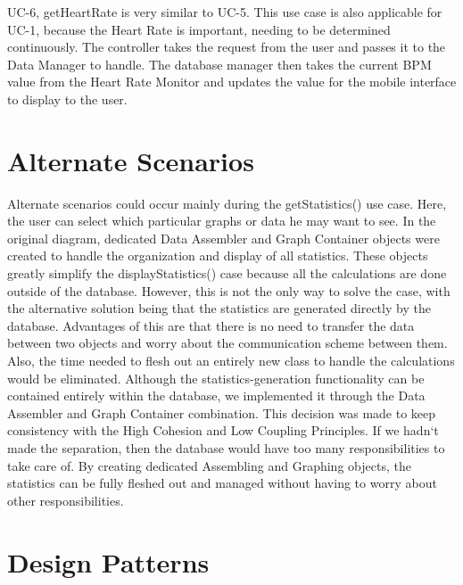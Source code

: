 \documentclass[letterpaper,english, 12pt]{scrreprt}
\begin{document}
UC-6, getHeartRate is very similar to UC-5. This use case is also applicable for UC-1, because the Heart Rate is important, needing to be determined continuously. The controller takes the request from the user and passes it to the Data Manager to handle. The database manager then takes the current BPM value from the Heart Rate Monitor and updates the value for the mobile interface to display to the user. 


\section{Alternate Scenarios}

Alternate scenarios could occur mainly during the getStatistics() use case. Here, the user can select which particular graphs or data he may want to see. In the original diagram,  dedicated Data Assembler and Graph Container objects were created to handle the organization and display of all statistics. These objects greatly simplify the displayStatistics() case because all the calculations are done outside of the database. However, this is not the only way to solve the case, with the alternative solution being that the statistics are generated directly by the database. Advantages of this are that there is no need to transfer the data between two objects and worry about the communication scheme between them. Also, the time needed to flesh out an entirely new class to handle the calculations would be eliminated. Although the statistics-generation functionality can be contained entirely within the database, we implemented it through the Data Assembler and Graph Container combination. This decision was made to keep consistency with the High Cohesion and Low Coupling Principles. If we hadn`t made the separation, then the database would have too many responsibilities to take care of. By creating dedicated Assembling and Graphing objects, the statistics can be fully fleshed out and managed without having to worry about other responsibilities.

\section{Design Patterns}
\end{document}
